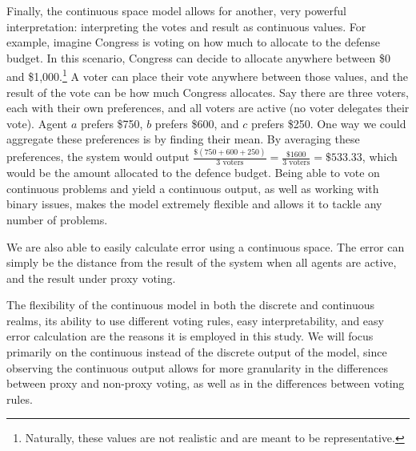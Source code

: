 Finally, the continuous space model allows for another, very powerful interpretation:
interpreting the votes and result as continuous values.
For example, imagine Congress is voting on how much to allocate to the defense budget.
In this scenario, Congress can decide to allocate anywhere between \$0 and \$1,000.\footnote{
    Naturally, these values are not realistic and are meant to be representative.
}
A voter can place their vote anywhere between those values, and the result of the
vote can be how much Congress allocates.
Say there are three voters, each with their own preferences, and all voters are
active (no voter delegates their vote).
Agent $a$ prefers \$750, $b$ prefers \$600, and $c$ prefers \$250.
One way we could aggregate these preferences is by finding their mean.
By averaging these preferences, the system would output
$\frac{\$(750 + 600 + 250)}{3 \text{ voters}} = \frac{\$1600}{3 \text{ voters}} =
\$533.33$,
which would be the amount allocated to the defence budget.
Being able to vote on continuous problems and yield a continuous output, as well as
working with binary issues, makes the model extremely flexible and allows it to
tackle any number of problems.

We are also able to easily calculate error using a continuous space.
The error can simply be the distance from the result of the system when all agents
are active, and the result under proxy voting.

The flexibility of the continuous model in both the discrete and continuous realms, its
ability to use different voting rules, easy interpretability, and easy error
calculation are the reasons it is employed in this study.
We will focus primarily on the continuous instead of the discrete output of the
model, since observing the continuous output allows for more granularity in the
differences between proxy and non-proxy voting, as well as in the differences between
voting rules.

